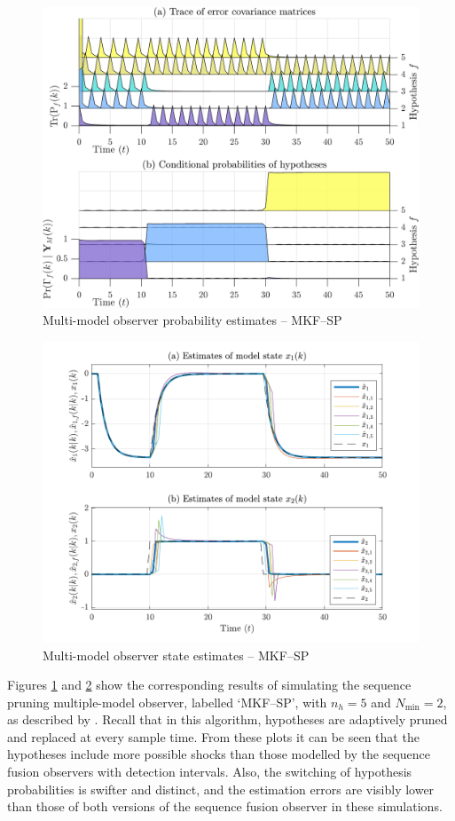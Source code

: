 \begin{figure}[htp]
	\centering
	\includegraphics[width=12cm]{images/rod_MKF_test_sim_MKF_SP_prob.png}
	\caption{Multi-model observer probability estimates – MKF--SP}
	\label{fig:rod-obs-sim-test-probs-SP}
\end{figure}
\begin{figure}[htp]
	\centering
	\includegraphics[width=13cm]{images/rod_MKF_test_sim_MKF_SP_x_est.pdf}
	\caption{Multi-model observer state estimates – MKF--SP}
	\label{fig:rod-obs-sim-test-x_est-SP}
\end{figure}
Figures \ref{fig:rod-obs-sim-test-probs-SP} and \ref{fig:rod-obs-sim-test-x_est-SP} show the corresponding results of simulating the sequence pruning multiple-model observer, labelled `MKF--SP', with $n_h=5$ and $N_\text{min}=2$, as described by \cite{eriksson_classification_1996}. Recall that in this algorithm, hypotheses are adaptively pruned and replaced at every sample time. From these plots it can be seen that the hypotheses include more possible shocks than those modelled by the sequence fusion observers with detection intervals. Also, the switching of hypothesis probabilities is swifter and distinct, and the estimation errors are visibly lower than those of both versions of the sequence fusion observer in these simulations.

